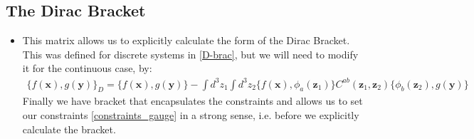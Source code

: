 \documentclass[11pt]{article}
\numberwithin{equation}{section}
\begin{document}
\subsection{The Dirac Bracket} %
\label{sub:the_dirac_bracket}
\begin{itemize}
  \item This matrix allows us to explicitly calculate the form of the Dirac Bracket. This was defined for discrete systems in \ref{D-brac}, but we will need to modify it for the continuous case, by: 
  \begin{align}
  \label{Dirac_B_cont}
    \{f(\textbf{x}),g(\textbf{y})\}_D = \{f(\textbf{x}),g(\textbf{y})\}-\int d^3z_1\int d^3z_2\{f(\textbf{x}),\phi_a(\textbf{z}_1)\}C^{ab}(\textbf{z}_1,\textbf{z}_2)\{\phi_b(\textbf{z}_2),g(\textbf{y})\}
  \end{align}
  Finally we have bracket that encapsulates the constraints and allows us to set our constraints \ref{constraints_gauge} in a strong sense, i.e. before we explicitly calculate the bracket. 


\end{itemize}
\end{document}
